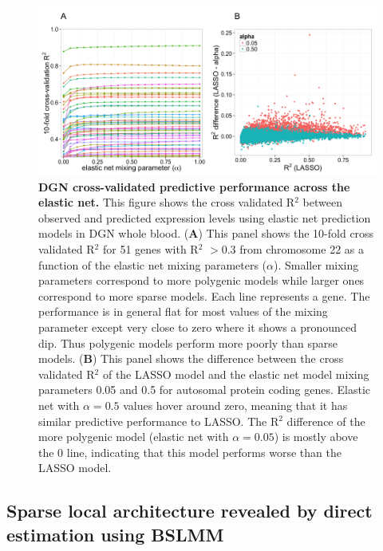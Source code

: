 \documentclass[10pt,letterpaper]{article}
\begin{document}
\begin{figure}[H]
\includegraphics[width=12cm]{Figures/Fig-DGN-EN.png}
\caption{{\bf DGN cross-validated predictive performance across the elastic net.} 
This figure shows the cross validated R$^2$ between observed and predicted expression levels using elastic net prediction models in DGN whole blood. (\textbf{A}) This panel shows the 10-fold cross validated R$^2$ for 51 genes with R$^2$ $>0.3$ from chromosome 22 as a function of the elastic net mixing parameters (\(\alpha\)). Smaller mixing parameters correspond to more polygenic models while larger ones correspond to more sparse models. Each line represents a gene. The performance is in general flat for most values of the mixing parameter except very close to zero where it shows a pronounced dip. Thus polygenic models perform more poorly than sparse models. (\textbf{B}) This panel shows the difference between the cross validated R$^2$ of the LASSO model and the elastic net model mixing parameters 0.05 and 0.5 for autosomal protein coding genes. Elastic net with $\alpha=0.5$ values hover around zero, meaning that it has similar predictive performance to LASSO. The R$^2$ difference of the more polygenic model (elastic net with $\alpha=0.05$) is mostly above the 0 line, indicating that this model performs worse than the LASSO model.
%
}
\label{fig-dgn-en}
\end{figure}

\subsection*{Sparse local architecture revealed by direct estimation using BSLMM}
\end{document}
